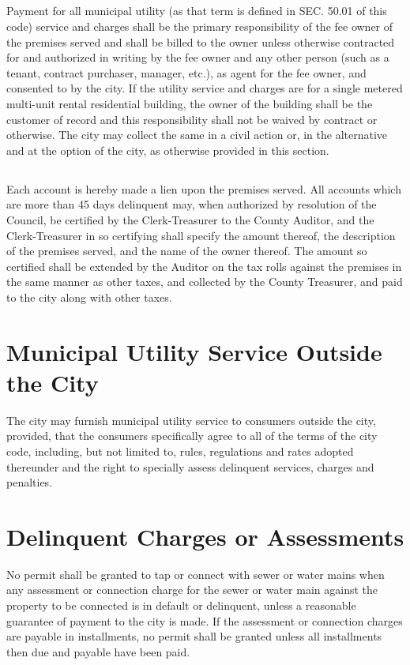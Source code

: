 \subsection{}
Payment for all municipal utility (as that term is defined in SEC. 50.01 of this code) service and charges shall be the primary responsibility of the fee owner of the premises served and shall be billed to the owner unless otherwise contracted for and authorized in writing by the fee owner and any other person (such as a tenant, contract purchaser, manager, etc.), as agent for the fee owner, and consented to by the city.  If the utility service and charges are for a single metered multi-unit rental residential building, the owner of the building shall be the customer of record and this responsibility shall not be waived by contract or otherwise.  The city may collect the same in a civil action or, in the alternative and at the option of the city, as otherwise provided in this section.
\subsection{}
Each account is hereby made a lien upon the premises served. All accounts which are more than 45 days delinquent may, when authorized by resolution of the Council, be certified by the Clerk-Treasurer to the County Auditor, and the Clerk-Treasurer in so certifying shall specify the amount thereof, the description of the premises served, and the name of the owner thereof. The amount so certified shall be extended by the Auditor on the tax rolls against the premises in the same manner as other taxes, and collected by the County Treasurer, and paid to the city along with other taxes.

\section{Municipal Utility Service Outside the City}
The city may furnish municipal utility service to consumers outside the city, provided, that the consumers specifically agree to all of the terms of the city code, including, but not limited to, rules, regulations and rates adopted thereunder and the right to specially assess delinquent services, charges and penalties.

\section{Delinquent Charges or Assessments}
No permit shall be granted to tap or connect with sewer or water mains when any assessment or connection charge for the sewer or water main against the property to be connected is in default or delinquent, unless a reasonable guarantee of payment to the city is made.  If the assessment or connection charges are payable in installments, no permit shall be granted unless all installments then due and payable have been paid.

